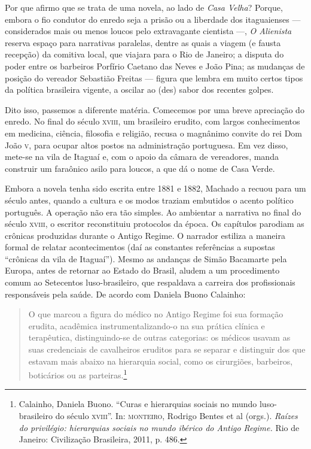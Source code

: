 Por que afirmo que se trata de uma novela, ao lado de \emph{Casa Velha}?
Porque, embora o fio condutor do enredo seja a prisão ou a liberdade dos
itaguaienses --- considerados mais ou menos loucos pelo extravagante
cientista ---, \emph{O Alienista} reserva espaço para narrativas
paralelas, dentre as quais a viagem (e fausta recepção) da comitiva
local, que viajara para o Rio de Janeiro; a disputa do poder entre os
barbeiros Porfírio Caetano das Neves e João Pina; as mudanças de posição
do vereador Sebastião Freitas --- figura que lembra em muito certos tipos
da política brasileira vigente, a oscilar ao (des) sabor dos recentes
golpes.

Dito isso, passemos a diferente matéria. Comecemos por uma breve
apreciação do enredo. No final do século \textsc{xviii}, um brasileiro erudito,
com largos conhecimentos em medicina, ciência, filosofia e religião,
recusa o magnânimo convite do rei Dom João \textsc{v}, para ocupar altos postos
na administração portuguesa. Em vez disso, mete-se na vila de Itaguaí e,
com o apoio da câmara de vereadores, manda construir um faraônico asilo
para loucos, a que dá o nome de Casa Verde.

Embora a novela tenha sido escrita entre 1881 e 1882, Machado a recuou
para um século antes, quando a cultura e os modos traziam embutidos o
acento político português. A operação não era tão simples. Ao ambientar
a narrativa no final do século \textsc{xviii}, o escritor reconstituiu protocolos
da época. Os capítulos parodiam as crônicas produzidas durante o Antigo
Regime. O narrador estiliza a maneira formal de relatar acontecimentos
(daí as constantes referências a supostas ``crônicas da vila de
Itaguaí''). Mesmo as andanças de Simão Bacamarte pela Europa, antes de
retornar ao Estado do Brasil, aludem a um procedimento comum ao
Setecentos luso-brasileiro, que respaldava a carreira dos profissionais
responsáveis pela saúde. De acordo com Daniela Buono Calainho:

\begin{quote}
O que marcou a figura do médico no Antigo Regime foi sua formação
erudita, acadêmica instrumentalizando-o na sua prática clínica e
terapêutica, distinguindo-se de outras categorias: os médicos usavam as
suas credenciais de cavalheiros eruditos para se separar e distinguir
dos que estavam mais abaixo na hierarquia social, como os cirurgiões,
barbeiros, boticários ou as parteiras.\footnote{Calainho, Daniela Buono.
  ``Curas e hierarquias sociais no mundo luso-brasileiro do século
  \textsc{xviii}''. In: \textsc{monteiro}, Rodrigo Bentes et al (orgs.). \emph{Raízes do
  privilégio: hierarquias sociais no mundo ibérico do Antigo Regime.}
  Rio de Janeiro: Civilização Brasileira, 2011, p. 486.}
\end{quote}

